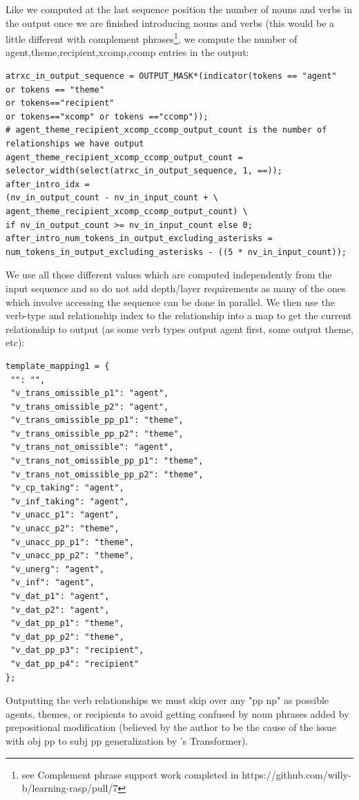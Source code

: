 \documentclass[11pt]{article}
\begin{document}
Like we computed at the last sequence position the number of nouns and verbs in the output once we are finished introducing nouns and verbs (this would be a little different with complement phrases\footnote{see Complement phrase support work completed in https://github.com/willy-b/learning-rasp/pull/7 }, we compute the number of agent,theme,recipient,xcomp,ccomp entries in the output:
\begin{tiny}
\begin{verbatim}
atrxc_in_output_sequence = OUTPUT_MASK*(indicator(tokens == "agent" 
or tokens == "theme" 
or tokens=="recipient" 
or tokens=="xcomp" or tokens =="ccomp"));
# agent_theme_recipient_xcomp_ccomp_output_count is the number of relationships we have output
agent_theme_recipient_xcomp_ccomp_output_count = 
selector_width(select(atrxc_in_output_sequence, 1, ==));
after_intro_idx = 
(nv_in_output_count - nv_in_input_count + \
agent_theme_recipient_xcomp_ccomp_output_count) \
if nv_in_output_count >= nv_in_input_count else 0;
after_intro_num_tokens_in_output_excluding_asterisks = 
num_tokens_in_output_excluding_asterisks - ((5 * nv_in_input_count));
\end{verbatim}
\end{tiny}
\clearpage
We use all those different values which are computed independently from the input sequence and so do not add depth/layer requirements as many of the ones which involve accessing the sequence can be done in parallel. 
We then use the verb-type and relationship index to the relationship into a map to get the current relationship to output (as some verb types output agent first, some output theme, etc):
\begin{tiny}
\begin{verbatim}
template_mapping1 = {
 "": "",
 "v_trans_omissible_p1": "agent",
 "v_trans_omissible_p2": "agent",
 "v_trans_omissible_pp_p1": "theme",
 "v_trans_omissible_pp_p2": "theme",
 "v_trans_not_omissible": "agent",
 "v_trans_not_omissible_pp_p1": "theme",
 "v_trans_not_omissible_pp_p2": "theme",
 "v_cp_taking": "agent",
 "v_inf_taking": "agent",
 "v_unacc_p1": "agent",
 "v_unacc_p2": "theme",
 "v_unacc_pp_p1": "theme",
 "v_unacc_pp_p2": "theme",
 "v_unerg": "agent",
 "v_inf": "agent",
 "v_dat_p1": "agent",
 "v_dat_p2": "agent",
 "v_dat_pp_p1": "theme",
 "v_dat_pp_p2": "theme",
 "v_dat_pp_p3": "recipient",
 "v_dat_pp_p4": "recipient"
};
\end{verbatim}
\end{tiny}

Outputting the verb relationships we must skip over any "pp np" as possible agents, themes, or recipients to avoid getting confused by noun phrases added by prepositional modification (believed by the author to be the cause of the issue with obj pp to subj pp generalization by \cite{Wu2023}'s Transformer).
\end{document}
